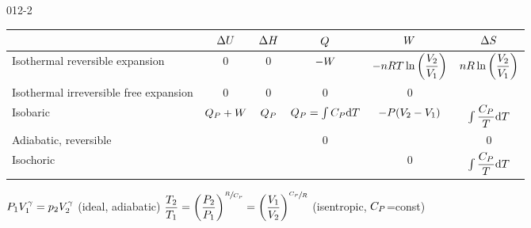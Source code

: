\begin{mitframe}{012-2}


\begin{longtable}{ | p{2cm} | c | c | c | c | c | } 
 \hline
     & $\Delta\intenergy$
    & $\Delta\enthalpy$ 
    & $\heatflow$ 
    & $\work$
    & $\Delta\entropy$
    \\
    \hline
	Isothermal reversible expansion & 0 & 0 & $-\work$ & $-n\gasconst\Temp\ln\bigg(\dfrac{\vol_{2}}{\vol_{1}}\bigg)$ & $n\gasconst\ln\bigg(\dfrac{\vol_{2}}{\vol_{1}}\bigg)$  \\ \hline
	
    Isothermal irreversible free expansion & 0 & 0 & 0 & 0 &  \\ \hline    
	Isobaric & $\heatflow_{\p}+\work$ & $\heatflow_{\p}$ & $\heatflow_{\p}=\int\cp\mathrm{d}\Temp$  & $-\p(\vol_{2}-\vol_{1})$ & $\int\dfrac{\cp}{\Temp}\mathrm{d}\Temp$  \\ \hline   
 	Adiabatic, reversible & & & 0 & & 0 \\ \hline
	Isochoric & & & & 0 & $\int\dfrac{\cp}{\Temp}\mathrm{d}\Temp$  \\ \hline 
\end{longtable}

\begin{listone}
	
    \item $\p_{1}\vol_{1}^{\gamma}=p_{2}\vol_{2}^{\gamma}$  (ideal, adiabatic)  $\dfrac{\Temp_{2}}{\Temp_{1}}=\bigg(\dfrac{\p_{2}}{\p_{1}}\bigg)^{\sfrac{\gasconst}{\cp}}=\bigg(\dfrac{\vol_{1}}{\vol_{2}}\bigg)^{\sfrac{\cp}{\gasconst}}$ (isentropic, $\cp$=const)
\end{listone}

\end{mitframe}